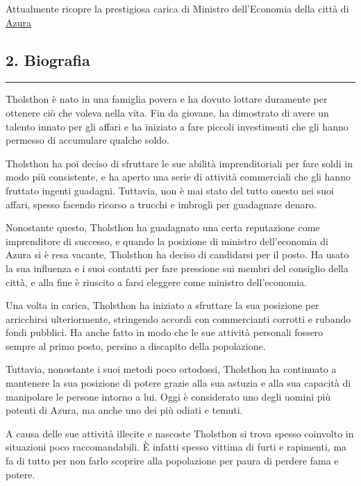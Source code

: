 Attualmente ricopre la prestigiosa carica di Ministro dell'Economia
della città di
\href{Azura\%207c14164a934a40648d94bf415b52eee0.md}{Azura}

\subsection{2. Biografia}\label{biografia}

\begin{center}\rule{0.5\linewidth}{0.5pt}\end{center}

Tholsthon è nato in una famiglia povera e ha dovuto lottare duramente
per ottenere ciò che voleva nella vita. Fin da giovane, ha dimostrato di
avere un talento innato per gli affari e ha iniziato a fare piccoli
investimenti che gli hanno permesso di accumulare qualche soldo.

Tholsthon ha poi deciso di sfruttare le sue abilità imprenditoriali per
fare soldi in modo più consistente, e ha aperto una serie di attività
commerciali che gli hanno fruttato ingenti guadagni. Tuttavia, non è mai
stato del tutto onesto nei suoi affari, spesso facendo ricorso a trucchi
e imbrogli per guadagnare denaro.

Nonostante questo, Tholsthon ha guadagnato una certa reputazione come
imprenditore di successo, e quando la posizione di ministro
dell'economia di Azura si è resa vacante, Tholsthon ha deciso di
candidarsi per il posto. Ha usato la sua influenza e i suoi contatti per
fare pressione sui membri del consiglio della città, e alla fine è
riuscito a farsi eleggere come ministro dell'economia.

Una volta in carica, Tholsthon ha iniziato a sfruttare la sua posizione
per arricchirsi ulteriormente, stringendo accordi con commercianti
corrotti e rubando fondi pubblici. Ha anche fatto in modo che le sue
attività personali fossero sempre al primo posto, persino a discapito
della popolazione.

Tuttavia, nonostante i suoi metodi poco ortodossi, Tholsthon ha
continuato a mantenere la sua posizione di potere grazie alla sua
astuzia e alla sua capacità di manipolare le persone intorno a lui. Oggi
è considerato uno degli uomini più potenti di Azura, ma anche uno dei
più odiati e temuti.

A causa delle sue attività illecite e nascoste Tholsthon si trova spesso
coinvolto in situazioni poco raccomandabili. È infatti spesso vittima di
furti e rapimenti, ma fa di tutto per non farlo scoprire alla
popolazione per paura di perdere fama e potere.

